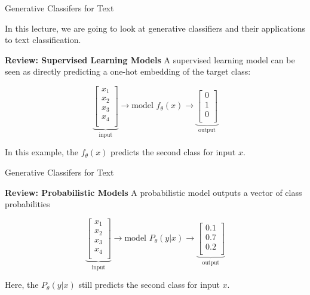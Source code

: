 \documentclass[../../generative_classifiers.tex]{subfiles}
\begin{document}
\begin{frame}[fragile]{Generative Classifers for Text}

In this lecture, we are going to look at generative classifiers and their applications to text classification.
\vspace{0.2cm}


\textbf{Review: Supervised Learning Models
}
A supervised learning model can be seen as directly predicting a one-hot embedding of the target class:

$$
\underbrace{\left[ 
\begin{array}{c}
x_1 \\
x_2 \\
x_3 \\
x_4 \\
\end{array}
\right]}_\text{input}
{\to}\text{model $f_\theta(x)$}{\to}
\underbrace{\left[ 
\begin{array}{c}
0 \\
1 \\
0 \\
\end{array}
\right]}_\text{output}
$$

In this example, the $f_\theta(x)$ predicts the second class for input $x$.


\end{frame}


\begin{frame}[fragile]{Generative Classifers for Text}



\textbf{Review: Probabilistic Models
}
A probabilistic model outputs a vector of class probabilities

$$
\underbrace{\left[ 
\begin{array}{c}
x_1 \\
x_2 \\
x_3 \\
x_4 \\
\end{array}
\right]}_\text{input}
{\to}\text{model $P_\theta(y|x)$}{\to}
\underbrace{\left[ 
\begin{array}{c}
0.1 \\
0.7 \\
0.2 \\
\end{array}
\right]}_\text{output}
$$

Here, the $P_\theta(y|x)$ still predicts the second class for input $x$.

\end{frame}
\end{document}
